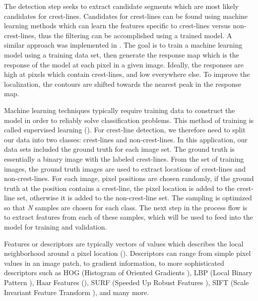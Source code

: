 The detection step seeks to extract candidate segments which are most likely candidates for crest-lines. Candidates for crest-lines can be found using machine learning methods which can learn the features specific to crest-lines versus non-crest-lines, thus the filtering can be accomplished using a trained model. A similar approach was implemented in \cite{2006_automated_classification_landform_elements,2007_Machine_Learning_tools_automatic_mapping_mars,2013_sar_image_automated_detection_dune_area,BandeiraMarques,2011_neural_network_based_dunal_landform_mapping,vaz_object_based_dune_analysis}. The goal is to train a machine learning model using a training data set, then generate the response map which is the response of the model at each pixel in a given image. Ideally, the responses are high at pixels which contain crest-lines, and low everywhere else. To improve the localization, the contours are shifted towards the nearest peak in the response map.

Machine learning techniques typically require training data to construct the model in order to reliably solve classification problems. This method of training is called supervised learning (\cite{foundations_machine_learning_book,machine_learning_book}). For crest-line detection, we therefore need to split our data into two classes: crest-lines and non-crest-lines. In this application, our data sets included the ground truth for each image set. The ground truth is essentially a binary image with the labeled crest-lines. From the set of training images, the ground truth images are used to extract locations of crest-lines and non-crest-lines. For each image, pixel positions are chosen randomly, if the ground truth at the position contains a crest-line, the pixel location is added to the crest-line set, otherwise it is added to the non-crest-line set. The sampling is optimized so that \emph{N} samples are chosen for each class. The next step in the process flow is to extract features from each of these samples, which will be used to feed into the model for training and validation.

Features or descriptors are typically vectors of values which describes the local neighborhood around a pixel location (\cite{lowe_sift_paper,1994_good_features_to_track,1998_feature_detection,2007_invariant_features_survey}). Descriptors can range from simple pixel values in an image patch, to gradient information, to more sophisticated descriptors such as HOG (Histogram of Oriented Gradients \cite{2007_hog_human_detection}), LBP (Local Binary Pattern \cite{1994_lbp_paper,1996_lbp_paper}), Haar Features (\cite{2001_viola_jones_paper}), SURF (Speeded Up Robust Features \cite{2006_surf}), SIFT (Scale Invariant Feature Transform \cite{lowe_sift_paper}), and many more. 

